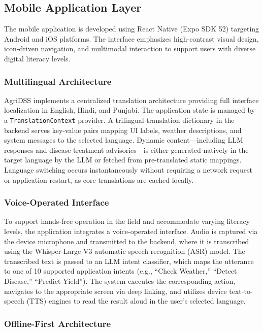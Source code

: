 \documentclass[conference]{IEEEtran}
\begin{document}
\subsection{Mobile Application Layer}

The mobile application is developed using React Native (Expo SDK 52) targeting Android and iOS platforms. The interface emphasizes high-contrast visual design, icon-driven navigation, and multimodal interaction to support users with diverse digital literacy levels.

\subsubsection{Multilingual Architecture}

AgriDSS implements a centralized translation architecture providing full interface localization in English, Hindi, and Punjabi. The application state is managed by a \texttt{TranslationContext} provider. A trilingual translation dictionary in the backend serves key-value pairs mapping UI labels, weather descriptions, and system messages to the selected language. Dynamic content---including LLM responses and disease treatment advisories---is either generated natively in the target language by the LLM or fetched from pre-translated static mappings. Language switching occurs instantaneously without requiring a network request or application restart, as core translations are cached locally.

\subsubsection{Voice-Operated Interface}

To support hands-free operation in the field and accommodate varying literacy levels, the application integrates a voice-operated interface. Audio is captured via the device microphone and transmitted to the backend, where it is transcribed using the Whisper-Large-V3 automatic speech recognition (ASR) model. The transcribed text is passed to an LLM intent classifier, which maps the utterance to one of 10 supported application intents (e.g., ``Check Weather,'' ``Detect Disease,'' ``Predict Yield''). The system executes the corresponding action, navigates to the appropriate screen via deep linking, and utilizes device text-to-speech (TTS) engines to read the result aloud in the user's selected language.

\subsubsection{Offline-First Architecture}
\end{document}
